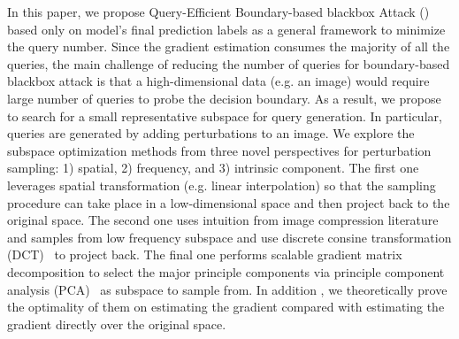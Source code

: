 In this paper,  we propose Query-Efficient Boundary-based blackbox Attack (\name) based only on model's final prediction labels as a general framework to minimize the query number.
Since the gradient estimation consumes the majority of all the queries, the main challenge of reducing the number of queries for boundary-based blackbox attack is that a high-dimensional data (e.g. an image) would require large number of queries to probe the decision boundary. As a result, we propose to search for a small representative subspace for query generation.
In particular, queries are generated by adding perturbations to an image. We explore the subspace optimization methods from three novel perspectives for perturbation sampling: 1) spatial, 2) frequency, and 3) intrinsic component.
The first one leverages spatial transformation (e.g. linear interpolation) so that the sampling procedure can take place in a low-dimensional space and then project back to the original space.
The second one uses intuition from image compression literature and samples from low frequency subspace and use discrete consine transformation (DCT)~\cite{guo2018low} to project back.
The final one performs scalable gradient matrix decomposition to select the major principle components via principle component analysis (PCA)~\cite{wold1987principal} as subspace to sample from.
In addition
, we theoretically prove the optimality of them on estimating the gradient compared with estimating the gradient directly over the original space.


